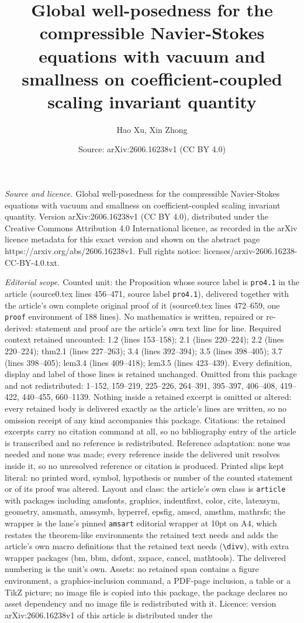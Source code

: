 \documentclass[10pt,a4paper]{amsart}
\title[Global well-posedness for the compressible Navier-Stokes equ]{Global well-posedness for the compressible Navier-Stokes equations with vacuum and smallness on coefficient-coupled scaling invariant quantity}
\author{Hao Xu, Xin Zhong}
\date{Source: arXiv:2606.16238v1 (CC BY 4.0)}
\begin{document}
\maketitle

\noindent\emph{Source and licence.} Global well-posedness for the compressible Navier-Stokes equations with vacuum and smallness on coefficient-coupled scaling invariant quantity. Version arXiv:2606.16238v1 (CC BY 4.0), distributed under the Creative Commons Attribution 4.0 International licence, as recorded in the arXiv licence metadata for this exact version and shown on the abstract page https://arxiv.org/abs/2606.16238v1. Full rights notice: licenses/arxiv-2606.16238-CC-BY-4.0.txt.\par\smallskip

\noindent\textit{Editorial scope.} Counted unit: the Proposition whose source label is \texttt{pro4.1} in the article (source0.tex lines 456--471, source label \texttt{pro4.1}), delivered together with the article's own complete original proof of it (source0.tex lines 472--659, one \texttt{proof} environment of 188 lines). No mathematics is written, repaired or re-derived: statement and proof are the article's own text line for line. Required context retained uncounted: 1.2 (lines 153--158); 2.1 (lines 220--224); 2.2 (lines 220--224); thm2.1 (lines 227--263); 3.4 (lines 392--394); 3.5 (lines 398--405); 3.7 (lines 398--405); lem3.4 (lines 409--418); lem3.5 (lines 423--439). Every definition, display and label of those lines is retained unchanged. Omitted from this package and not redistributed: 1--152, 159--219, 225--226, 264--391, 395--397, 406--408, 419--422, 440--455, 660--1139. Nothing inside a retained excerpt is omitted or altered: every retained body is delivered exactly as the article's lines are written, so no omission receipt of any kind accompanies this package. Citations: the retained excerpts carry no citation command at all, so no bibliography entry of the article is transcribed and no reference is redistributed. Reference adaptation: none was needed and none was made; every reference inside the delivered unit resolves inside it, so no unresolved reference or citation is produced. Printed slips kept literal: no printed word, symbol, hypothesis or number of the counted statement or of its proof was altered. Layout and class: the article's own class is \texttt{article} with packages including amsfonts, graphics, indentfirst, color, cite, latexsym, geometry, amsmath, amssymb, hyperref, epsfig, amscd, amsthm, mathrsfs; the wrapper is the lane's pinned \texttt{amsart} editorial wrapper at 10pt on A4, which restates the theorem-like environments the retained text needs and adds the article's own macro definitions that the retained text needs (\texttt{\textbackslash divv}), with extra wrapper packages (bm, bbm, dsfont, xspace, cancel, mathtools). The delivered numbering is the unit's own. Assets: no retained span contains a figure environment, a graphics-inclusion command, a PDF-page inclusion, a table or a TikZ picture; no image file is copied into this package, the package declares no asset dependency and no image file is redistributed with it. Licence: version arXiv:2606.16238v1 of this article is distributed under the 
\end{document}
